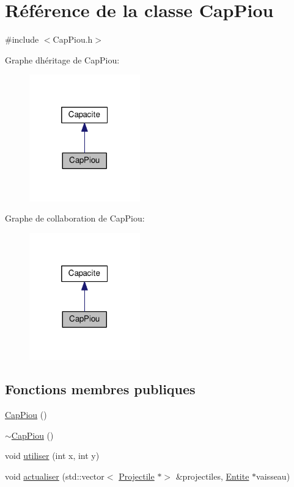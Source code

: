 \hypertarget{class_cap_piou}{}\section{Référence de la classe Cap\+Piou}
\label{class_cap_piou}


{\ttfamily \#include $<$Cap\+Piou.\+h$>$}



Graphe d\textquotesingle{}héritage de Cap\+Piou\+:\nopagebreak
\begin{figure}[H]
\begin{center}
\leavevmode
\includegraphics[width=136pt]{class_cap_piou__inherit__graph}
\end{center}
\end{figure}


Graphe de collaboration de Cap\+Piou\+:\nopagebreak
\begin{figure}[H]
\begin{center}
\leavevmode
\includegraphics[width=136pt]{class_cap_piou__coll__graph}
\end{center}
\end{figure}
\subsection*{Fonctions membres publiques}
\begin{DoxyCompactItemize}
\item 
\hyperlink{class_cap_piou_aa2ed61fb1313a447cf8444399001750d}{Cap\+Piou} ()
\item 
\hyperlink{class_cap_piou_a35d7e0b0c14d6a6e01ba0a053a8a60bd}{$\sim$\+Cap\+Piou} ()
\item 
void \hyperlink{class_cap_piou_a20ed7a993ce209a3df246f655f107f22}{utiliser} (int x, int y)
\item 
void \hyperlink{class_cap_piou_aabdcaa253f10db2bca12e750005485fc}{actualiser} (std\+::vector$<$ \hyperlink{class_projectile}{Projectile} $\ast$$>$ \&projectiles, \hyperlink{class_entite}{Entite} $\ast$vaisseau)
\end{DoxyCompactItemize}
